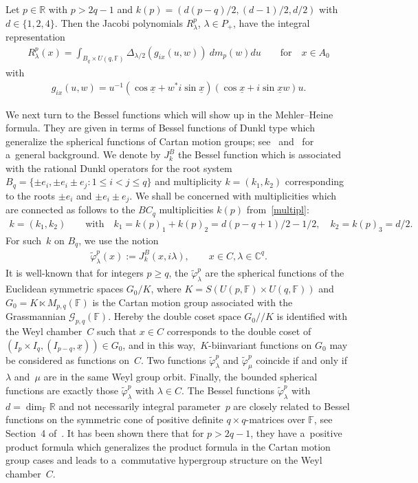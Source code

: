 \begin{Proposition}
\label{int-rep-prop}
Let $p\in \mathbb R$ with $p>2q-1$ and $k(p)= (d(p-q)/2, (d-1)/2, d/2)$ with $d\in\{1,2,4\}$.
Then the Jacobi polynomials $ R_\lambda^p$, $\lambda \in P_+$, have the integral representation
\begin{gather}
\label{int-rep}
R_\lambda^p(x)= \int_{B_q\times U(q,\mathbb F)} \Delta_{\lambda/2}(g_{ix}(u,w))\> dm_p(w)du
\qquad
\text{for}
\quad
x\in A_0
\end{gather}
with
\begin{gather*}
g_{ix}(u,w)=u^{-1}(\cos\underline x+w^* i\sin \underline x)(\cos\underline x+i\sin \underline x w)u.
\end{gather*}
\end{Proposition}

We next turn to the Bessel functions which will show up in the Mehler--Heine formula.
They are given in terms of Bessel functions of Dunkl type which generalize the spherical functions of Cartan motion
groups; see~\cite{dJ} and~\cite{O} for a~general background.
We denote by $J_k^B$ the Bessel function which is associated with the rational Dunkl operators for the root system $B_q=
\{\pm e_i, \pm e_i \pm e_j: 1\leq i< j \leq q\}$ and multiplicity $k=(k_1, k_2)$ corresponding to the roots $\pm e_i$
and $\pm e_i \pm e_j$.
We shall be concerned with multiplicities which are connected as follows to the $BC_q$ multiplicities $k(p)$
from~\eqref{multipl}:
\begin{gather*}
k= (k_1, k_2)
\qquad
\text{with}
\quad
k_1=k(p)_1+k(p)_2=d(p-q+1)/2-1/2,
\quad
k_2=k(p)_3=d/2.
\end{gather*}
For such~$k$ on $B_q$, we use the notion
\begin{gather*}
\widetilde\varphi_\lambda^{p}(x):=J_k^B(x, i\lambda),
\qquad
x\in C, \lambda \in \mathbb C^q.
\end{gather*}
It is well-known that for integers $p\geq q$, the $\widetilde\varphi_\lambda^{p}$ are the spherical functions of the
Euclidean symmetric spaces $G_0/K$, where $K=S(U(p,\mathbb F)\times U(q,\mathbb F))$ and $G_0= K\ltimes M_{p,q}(\mathbb F)$
is the Cartan motion group associated with the Grassmannian $\mathcal G_{p,q}(\mathbb F)$. Hereby the double coset
space $G_0//K$ is identif\/ied with the Weyl chamber~$C$ such that $x\in C$ corresponds to the double coset of $(I_p\times
I_q, (I_{p-q},\underline x) ) \in G_0$, and in this way,~$K$-biinvariant functions on $G_0$ may be considered as
functions on~$C$.
Two functions $\widetilde\varphi_\lambda^{p}$ and $\widetilde\varphi_\mu^{p}$ coincide if and only if~$\lambda$
and~$\mu$ are in the same Weyl group orbit.
Finally, the bounded spherical functions are exactly those $\widetilde\varphi_\lambda^{p}$ with $\lambda\in C$.
The Bessel functions $\widetilde\varphi_\lambda^{p}$ with $d=\dim_\mathbb F\mathbb R$ and not necessarily
integral parameter~$p$ are closely related to Bessel functions on the symmetric cone of positive def\/inite $q\times
q$-matrices over $\mathbb F$, see Section~4 of~\cite{R1}.
It has been shown there that for $p>2q-1$, they have a~positive product formula which generalizes the product formula in
the Cartan motion group cases and leads to a~commutative hypergroup structure on the Weyl chamber~$C$.

